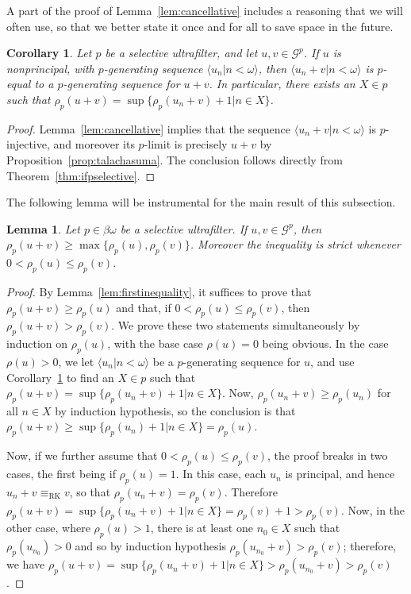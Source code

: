 \documentclass[10pt]{amsart}
\newcommand{\eqrk}[2]{#1\equiv_{\mathrm{RK}}#2}
\newtheorem{lemma}[theorem]{Lemma}
\newtheorem{corollary}[theorem]{Corollary}
\theoremstyle{definition}
\theoremstyle{remark}
\begin{document}
A part of the proof of Lemma~\ref{lem:cancellative} includes a reasoning that we will often use, so that we better state it once and for all to save space in the future.

\begin{corollary}\label{cor:generatingsum}
    Let $p$ be a selective ultrafilter, and let $u,v\in\mathscr G^p$. If $u$ is nonprincipal, with $p$-generating sequence $\langle u_n\big|n<\omega\rangle$, then $\langle u_n+v\big|n<\omega\rangle$ is $p$-equal to a $p$-generating sequence for $u+v$. In particular, there exists an $X\in p$ such that $\rho_p(u+v)=\sup\{\rho_p(u_n+v)+1\big|n\in X\}$.
\end{corollary}

\begin{proof}
     Lemma~\ref{lem:cancellative} implies that the sequence $\langle u_n+v\big|n<\omega\rangle$ is $p$-injective, and moreover its $p$-limit is precisely $u+v$ by Proposition~\ref{prop:talachasuma}. The conclusion follows directly from Theorem~\ref{thm:ifpselective}.
\end{proof}

The following lemma will be instrumental for the main result of this subsection.

\begin{lemma}\label{lem:rankofsums}
Let $p\in\beta\omega$ be a selective ultrafilter. If $u,v\in\mathscr G^p$, then $\rho_p(u+v)\geq\max\{\rho_p(u),\rho_p(v)\}$. Moreover the inequality is strict whenever $0<\rho_p(u)\leq\rho_p(v)$.
\end{lemma}

\begin{proof}
    By Lemma~\ref{lem:firstinequality}, it suffices to prove that $\rho_p(u+v)\geq\rho_p(u)$ and that, if $0<\rho_p(u)\leq\rho_p(v)$, then $\rho_p(u+v)>\rho_p(v)$. We prove these two statements simultaneously by induction on $\rho_p(u)$, with the base case $\rho(u)=0$ being obvious. In the case $\rho(u)>0$, we let $\langle u_n\big|n<\omega\rangle$ be a $p$-generating sequence for $u$, and use Corollary~\ref{cor:generatingsum} to find an $X\in p$ such that $\rho_p(u+v)=\sup\{\rho_p(u_n+v)+1\big|n\in X\}$. Now, $\rho_p(u_n+v)\geq\rho_p(u_n)$ for all $n\in X$ by induction hypothesis, so the conclusion is that $\rho_p(u+v)\geq\sup\{\rho_p(u_n)+1\big|n\in X\}=\rho_p(u)$.
    
    Now, if we further assume that $0<\rho_p(u)\leq\rho_p(v)$, the proof breaks in two cases, the first being if $\rho_p(u)=1$. In this case, each $u_n$ is principal, and hence $\eqrk{u_n+v}{v}$, so that $\rho_p(u_n+v)=\rho_p(v)$. Therefore $\rho_p(u+v)=\sup\{\rho_p(u_n+v)+1\big|n\in X\}=\rho_p(v)+1>\rho_p(v)$. Now, in the other case, where $\rho_p(u)>1$, there is at least one $n_0\in X$ such that $\rho_p(u_{n_0})>0$ and so by induction hypothesis $\rho_p(u_{n_0}+v)>\rho_p(v)$; therefore, we have $\rho_p(u+v)=\sup\{\rho_p(u_n+v)+1\big|n\in X\}>\rho_p(u_{n_0}+v)>\rho_p(v)$.
\end{proof}
\end{document}
